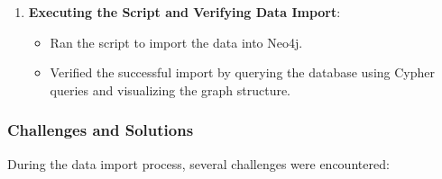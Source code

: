 \documentclass[conference]{IEEEtran}
\begin{document}
\begin{enumerate}
    \item \textbf{Executing the Script and Verifying Data Import}:
    \begin{itemize}
        \item Ran the script to import the data into Neo4j.
        \item Verified the successful import by querying the database using Cypher queries and visualizing the graph structure.
    \end{itemize}
\end{enumerate}

\subsubsection{Challenges and Solutions}

During the data import process, several challenges were encountered:
\end{document}
